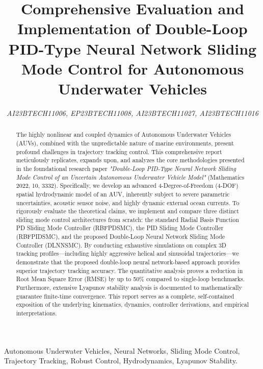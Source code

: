 \documentclass[conference]{IEEEtran}
\begin{document}
\title{Comprehensive Evaluation and Implementation of Double-Loop PID-Type Neural Network Sliding Mode Control for Autonomous Underwater Vehicles}

\author{
\textit{AI23BTECH11006, EP23BTECH11008, AI23BTECH11027, AI23BTECH11016}}
\maketitle

\begin{abstract}
The highly nonlinear and coupled dynamics of Autonomous Underwater Vehicles (AUVs), combined with the unpredictable nature of marine environments, present profound challenges in trajectory tracking control. This comprehensive report meticulously replicates, expands upon, and analyzes the core methodologies presented in the foundational research paper \textit{"Double-Loop PID-Type Neural Network Sliding Mode Control of an Uncertain Autonomous Underwater Vehicle Model"} (Mathematics 2022, 10, 3332). Specifically, we develop an advanced 4-Degree-of-Freedom (4-DOF) spatial hydrodynamic model of an AUV, inherently subject to severe parametric uncertainties, acoustic sensor noise, and highly dynamic external ocean currents. To rigorously evaluate the theoretical claims, we implement and compare three distinct sliding mode control architectures from scratch: the standard Radial Basis Function PD Sliding Mode Controller (RBFPDSMC), the PID Sliding Mode Controller (RBFPIDSMC), and the proposed Double-Loop Neural Network Sliding Mode Controller (DLNNSMC). By conducting exhaustive simulations on complex 3D tracking profiles—including highly aggressive helical and sinusoidal trajectories—we demonstrate that the proposed double-loop neural network-based approach provides superior trajectory tracking accuracy. The quantitative analysis proves a reduction in Root Mean Square Error (RMSE) by up to 50\% compared to single-loop benchmarks. Furthermore, extensive Lyapunov stability analysis is documented to mathematically guarantee finite-time convergence. This report serves as a complete, self-contained exposition of the underlying kinematics, dynamics, controller derivations, and empirical interpretations.
\end{abstract}

\begin{IEEEkeywords}
Autonomous Underwater Vehicles, Neural Networks, Sliding Mode Control, Trajectory Tracking, Robust Control, Hydrodynamics, Lyapunov Stability.
\end{IEEEkeywords}
\end{document}

